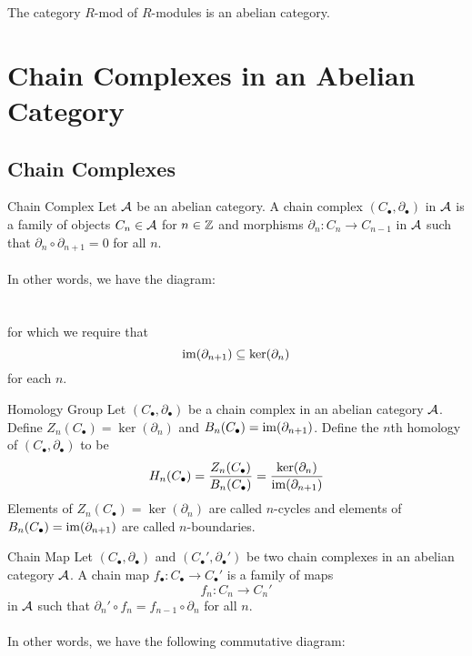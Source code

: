 \documentclass[a4paper]{article}
\begin{document}
\begin{thm}{}{} The category $R$-mod of $R$-modules is an abelian category. 
\end{thm}

\pagebreak
\section{Chain Complexes in an Abelian Category}
\subsection{Chain Complexes}
\begin{defn}{Chain Complex}{} Let $\mathcal{A}$ be an abelian category. A chain complex $(C_\bullet,\partial_\bullet)$ in $\mathcal{A}$ is a family of objects $C_n\in\mathcal{A}$ for $n\in\mathbb{Z}$ and morphisms $\partial_n:C_n\to C_{n-1}$ in $\mathcal{A}$ such that $\partial_n\circ\partial_{n+1}=0$ for all $n$. \\~\\
In other words, we have the diagram: \\
\\~\\
for which we require that $$\operatorname{im}(\partial_{n+1})\subseteq\ker(\partial_n)$$ for each $n$. 
\end{defn}

\begin{defn}{Homology Group}{} Let $(C_\bullet,\partial_\bullet)$ be a chain complex in an abelian category $\mathcal{A}$. Define $Z_n(C_\bullet)=\ker(\partial_n)$ and $B_n(C_\bullet)=\operatorname{im}(\partial_{n+1})$. Define the $n$th homology of $(C_\bullet,\partial_\bullet)$ to be $$H_n(C_\bullet)=\frac{Z_n(C_\bullet)}{B_n(C_\bullet)}=\frac{\ker(\partial_n)}{\operatorname{im}(\partial_{n+1})}$$
Elements of $Z_n(C_\bullet)=\ker(\partial_n)$ are called $n$-cycles and elements of $B_n(C_\bullet)=\operatorname{im}(\partial_{n+1})$ are called $n$-boundaries. 
\end{defn}

\begin{defn}{Chain Map}{} Let $(C_\bullet,\partial_\bullet)$ and $(C_\bullet',\partial_\bullet')$ be two chain complexes in an abelian category $\mathcal{A}$. A chain map $f_\bullet:C_\bullet\to C_\bullet'$ is a family of maps $$f_n:C_n\to C_n'$$ in $\mathcal{A}$ such that $\partial_n'\circ f_n=f_{n-1}\circ\partial_n$ for all $n$. \\~\\
In other words, we have the following commutative diagram: \\
\end{defn}
\end{document}
